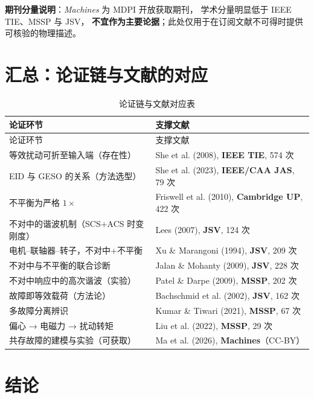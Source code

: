 \documentclass[11pt,a4paper]{ctexart}
\begin{document}
\noindent
\textbf{期刊分量说明}：\emph{Machines} 为 MDPI 开放获取期刊，
学术分量明显低于 IEEE TIE、MSSP 与 JSV，
\textbf{不宜作为主要论据}；此处仅用于在订阅文献不可得时提供可核验的物理描述。

\section{汇总：论证链与文献的对应}

\begin{longtable}{@{}p{6.6cm}p{6.4cm}@{}}
\caption{论证链与文献对应表}\\
\toprule
论证环节 & 支撑文献 \\
\midrule
\endfirsthead
\toprule
论证环节 & 支撑文献 \\
\midrule
\endhead
\bottomrule
\endfoot
等效扰动可折至输入端（存在性） & She et al. (2008), \textbf{IEEE TIE}, 574 次 \\
EID 与 GESO 的关系（方法选型） & She et al. (2023), \textbf{IEEE/CAA JAS}, 79 次 \\
不平衡为严格 $1\times$ & Friswell et al. (2010), \textbf{Cambridge UP}, 422 次 \\
不对中的谐波机制（SCS+ACS 时变刚度） & Lees (2007), \textbf{JSV}, 124 次 \\
电机--联轴器--转子，不对中+不平衡 & Xu \& Marangoni (1994), \textbf{JSV}, 209 次 \\
不对中与不平衡的联合诊断 & Jalan \& Mohanty (2009), \textbf{JSV}, 228 次 \\
不对中响应中的高次谐波（实验） & Patel \& Darpe (2009), \textbf{MSSP}, 202 次 \\
故障即等效载荷（方法论） & Bachschmid et al. (2002), \textbf{JSV}, 162 次 \\
多故障分离辨识 & Kumar \& Tiwari (2021), \textbf{MSSP}, 67 次 \\
偏心 → 电磁力 → 扰动转矩 & Liu et al. (2022), \textbf{MSSP}, 29 次 \\
共存故障的建模与实验（可获取） & Ma et al. (2026), \textbf{Machines}（CC-BY） \\
\end{longtable}

\section{结论}
\end{document}
